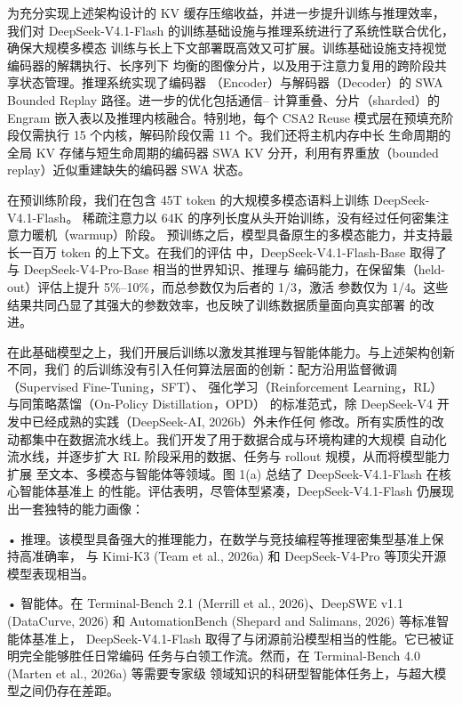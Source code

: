 \documentclass[
  10
]{article}
\begin{document}
为充分实现上述架构设计的 KV 缓存压缩收益，并进一步提升训练与推理效率，我们对
DeepSeek-V4.1-Flash 的训练基础设施与推理系统进行了系统性联合优化，确保大规模多模态
训练与长上下文部署既高效又可扩展。训练基础设施支持视觉编码器的解耦执行、长序列下
均衡的图像分片，以及用于注意力复用的跨阶段共享状态管理。推理系统实现了编码器
（Encoder）与解码器（Decoder）的 SWA Bounded Replay 路径。进一步的优化包括通信--
计算重叠、分片（sharded）的 Engram 嵌入表以及推理内核融合。特别地，每个 CSA2 Reuse
模式层在预填充阶段仅需执行 15 个内核，解码阶段仅需 11 个。我们还将主机内存中长
生命周期的全局 KV 存储与短生命周期的编码器 SWA KV 分开，利用有界重放（bounded
replay）近似重建缺失的编码器 SWA 状态。



在预训练阶段，我们在包含 45T token 的大规模多模态语料上训练 DeepSeek-V4.1-Flash。
稀疏注意力以 64K 的序列长度从头开始训练，没有经过任何密集注意力暖机（warmup）阶段。
预训练之后，模型具备原生的多模态能力，并支持最长一百万 token 的上下文。在我们的评估
中，DeepSeek-V4.1-Flash-Base 取得了与 DeepSeek-V4-Pro-Base 相当的世界知识、推理与
编码能力，在保留集（held-out）评估上提升 5\%--10\%，而总参数仅为后者的 1/3，激活
参数仅为 1/4。这些结果共同凸显了其强大的参数效率，也反映了训练数据质量面向真实部署
的改进。

在此基础模型之上，我们开展后训练以激发其推理与智能体能力。与上述架构创新不同，我们
的后训练没有引入任何算法层面的创新：配方沿用监督微调（Supervised Fine-Tuning，SFT）、
强化学习（Reinforcement Learning，RL）与同策略蒸馏（On-Policy Distillation，OPD）
的标准范式，除 DeepSeek-V4 开发中已经成熟的实践（DeepSeek-AI, 2026b）外未作任何
修改。所有实质性的改动都集中在数据流水线上。我们开发了用于数据合成与环境构建的大规模
自动化流水线，并逐步扩大 RL 阶段采用的数据、任务与 rollout 规模，从而将模型能力扩展
至文本、多模态与智能体等领域。图 1(a) 总结了 DeepSeek-V4.1-Flash 在核心智能体基准上
的性能。评估表明，尽管体型紧凑，DeepSeek-V4.1-Flash 仍展现出一套独特的能力画像：

• 推理。该模型具备强大的推理能力，在数学与竞技编程等推理密集型基准上保持高准确率，
与 Kimi-K3 (Team et al., 2026a) 和 DeepSeek-V4-Pro 等顶尖开源模型表现相当。

• 智能体。在 Terminal-Bench 2.1 (Merrill et al., 2026)、DeepSWE v1.1 (DataCurve,
2026) 和 AutomationBench (Shepard and Salimans, 2026) 等标准智能体基准上，
DeepSeek-V4.1-Flash 取得了与闭源前沿模型相当的性能。它已被证明完全能够胜任日常编码
任务与白领工作流。然而，在 Terminal-Bench 4.0 (Marten et al., 2026a) 等需要专家级
领域知识的科研型智能体任务上，与超大模型之间仍存在差距。
\end{document}
